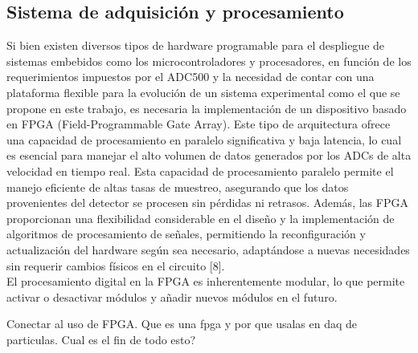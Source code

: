 \documentclass[]{book}
\begin{document}

\subsection*{Sistema de adquisición y procesamiento}

\noindent Si bien existen diversos tipos de hardware programable para el despliegue de sistemas embebidos como los microcontroladores y procesadores, en función de los requerimientos impuestos por el ADC500 y la necesidad de contar con una plataforma flexible para la evolución de un sistema experimental como el que se propone en este trabajo, es necesaria la implementación de un dispositivo basado en FPGA (Field-Programmable Gate Array). Este tipo de arquitectura ofrece una capacidad de procesamiento en paralelo significativa y baja latencia, lo cual es esencial para manejar el alto volumen de datos generados por los ADCs de alta velocidad en tiempo real. Esta capacidad de procesamiento paralelo permite el manejo eficiente de altas tasas de muestreo, asegurando que los datos provenientes del detector se procesen sin pérdidas ni retrasos. Además, las FPGA proporcionan una flexibilidad considerable en el diseño y la implementación de algoritmos de procesamiento de señales, permitiendo la reconfiguración y actualización del hardware según sea necesario, adaptándose a nuevas necesidades sin requerir cambios físicos en el circuito [8].\\

\noindent El procesamiento digital en la FPGA es inherentemente modular, lo que permite activar o desactivar módulos y añadir nuevos módulos en el futuro.

\noindent Conectar al uso de FPGA. Que es una fpga y por que usalas en daq de particulas. Cual es el fin de todo esto?    
\end{document}
